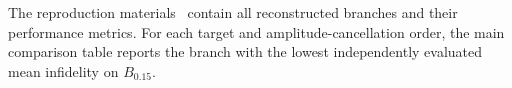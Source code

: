 \documentclass[10pt,aps,twocolumn,pra,floatfix,superscriptaddress]{revtex4-2}
\begin{document}
The reproduction materials~\cite{my_github_repo} contain all reconstructed branches and
their performance metrics. For each target and amplitude-cancellation
order, the main comparison table reports the branch with the lowest
independently evaluated mean infidelity on $B_{0.15}$.



\clearpage

\end{document}
